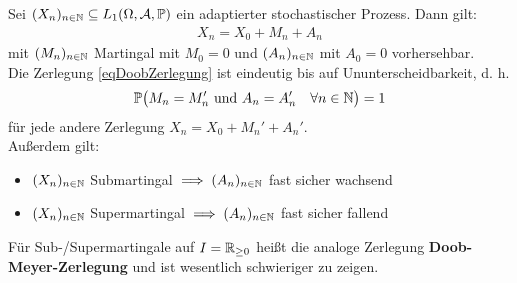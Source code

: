 \begin{theorem}\label{Theorem2.3DoobZerlegung}\enter
Sei $(X_n)_{n\in\mathbb{N}}\subseteq L_1(\Omega,\mathcal{A},\mathbb{P})$ ein adaptierter stochastischer Prozess. Dann gilt:
\begin{align}\label{eqDoobZerlegung}\tag{DZ}
X_n=X_0+M_n+A_n
\end{align}
mit $(M_n)_{n\in\mathbb{N}}$ Martingal mit $M_0=0$ und $(A_n)_{n\in\mathbb{N}}$ mit $A_0=0$ vorhersehbar.\\
Die Zerlegung \eqref{eqDoobZerlegung} ist eindeutig bis auf Ununterscheidbarkeit, d. h.
\begin{align*}
\mathbb{P}\big(M_n=M_n'\text{ und }A_n=A_n'\quad\forall n\in\mathbb{N}\big)=1
\end{align*}
für jede andere Zerlegung $X_n=X_0+M_n'+A_n'$.\\
Außerdem gilt:
\begin{itemize}
\item $(X_n)_{n\in\mathbb{N}}$ Submartingal $\implies (A_n)_{n\in\mathbb{N}}$ fast sicher wachsend
\item $(X_n)_{n\in\mathbb{N}}$ Supermartingal $\implies (A_n)_{n\in\mathbb{N}}$ fast sicher fallend
\end{itemize}
\end{theorem}

\begin{bemerkung}
Für Sub-/Supermartingale auf $I=\mathbb{R}_{\geq0}$ heißt die analoge Zerlegung \textbf{Doob-Meyer-Zerlegung} und ist wesentlich schwieriger zu zeigen.
\end{bemerkung}

